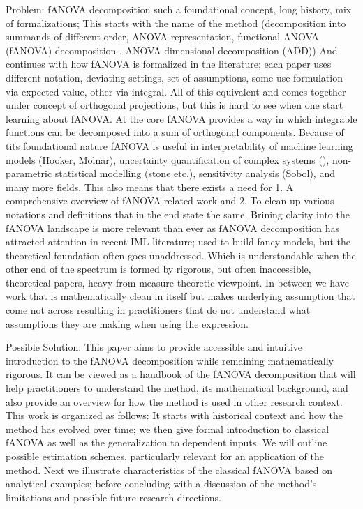 
Problem: fANOVA decomposition such a foundational concept, long history, mix of formalizations;
This starts with the name of the method (decomposition into summands of different order, ANOVA representation, functional ANOVA (fANOVA) decomposition \cite{hooker2004}, ANOVA dimensional decomposition (ADD))
And continues with how fANOVA is formalized in the literature; each paper uses different notation, deviating settings, set of assumptions, some use formulation via expected value, other via integral.
All of this equivalent and comes together under concept of orthogonal projections, but this is hard to see when one start learning about fANOVA.
At the core fANOVA provides a way in which integrable functions can be decomposed into a sum of orthogonal components. Because of tits foundational nature fANOVA is useful in interpretability of machine learning models (Hooker, Molnar), uncertainty quantification of complex systems (\cite{rahman2014}), non-parametric statistical modelling (stone etc.), sensitivity analysis (Sobol), and many more fields.
This also means that there exists a need for 1. A comprehensive overview of fANOVA-related work and 2. To clean up various notations and definitions that in the end state the same.
Brining clarity into the fANOVA landscape is more relevant than ever as fANOVA decomposition has attracted attention in recent IML literature; used to build fancy models, but the theoretical foundation often goes unaddressed.
Which is understandable when the other end of the spectrum is formed by rigorous, but often inaccessible, theoretical papers, heavy from measure theoretic viewpoint. In between we have work that is mathematically clean in itself but makes underlying assumption that come not across resulting in practitioners that do not understand what assumptions they are making when using the expression.

Possible Solution: This paper aims to provide accessible and intuitive introduction to the fANOVA decomposition while remaining mathematically rigorous.
It can be viewed as a handbook of the fANOVA decomposition that will help practitioners to understand the method, its mathematical background, and also provide an overview for how the method is used in other research context.
This work is organized as follows: It starts with historical context and how the method has evolved over time; we then give formal introduction to classical fANOVA as well as the generalization to dependent inputs. We will outline possible estimation schemes, particularly relevant for an application of the method. Next we illustrate characteristics of the classical fANOVA based on analytical examples; before concluding with a discussion of the method's limitations and possible future research directions.
